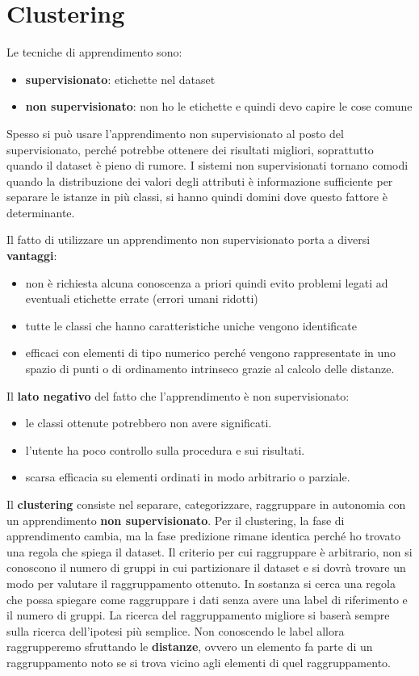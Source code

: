 \chapter{Clustering}
Le tecniche di apprendimento sono:
\begin{itemize}
    \item \textbf{supervisionato}: etichette nel dataset
    \item \textbf{non supervisionato}: non ho le etichette e quindi devo capire
          le cose comune
\end{itemize}
Spesso si può usare l'apprendimento non supervisionato al posto del supervisionato,
perché potrebbe ottenere dei risultati migliori, soprattutto quando il dataset è
pieno di rumore. I sistemi non supervisionati tornano comodi quando la distribuzione
dei valori degli attributi è informazione sufficiente per separare le istanze in più
classi, si hanno quindi domini dove questo fattore è determinante.

Il fatto di utilizzare un apprendimento non supervisionato porta a diversi
\textbf{vantaggi}:
\begin{itemize}
    \item non è richiesta alcuna conoscenza a priori quindi evito problemi legati
          ad eventuali etichette errate (errori umani ridotti)
    \item tutte le classi che hanno caratteristiche uniche vengono identificate
    \item efficaci con elementi di tipo numerico perché vengono rappresentate in
          uno spazio di punti o di ordinamento intrinseco grazie al calcolo delle
          distanze.
\end{itemize}
Il \textbf{lato negativo} del fatto che l'apprendimento è non supervisionato:
\begin{itemize}
    \item le classi ottenute potrebbero non avere significati.
    \item l'utente ha poco controllo sulla procedura e sui risultati.
    \item scarsa efficacia su elementi ordinati in modo arbitrario o parziale.
\end{itemize}
Il \textbf{clustering} consiste nel  separare, categorizzare, raggruppare in
autonomia con un apprendimento \textbf{non supervisionato}.
Per il clustering, la fase di apprendimento cambia, ma la fase predizione rimane
identica perché ho trovato una regola che spiega il dataset. Il criterio per cui
raggruppare è arbitrario, non si conoscono il numero di gruppi in cui partizionare
il dataset e si dovrà trovare un modo per valutare il raggruppamento ottenuto.
In sostanza si cerca una regola che possa spiegare come raggruppare i dati senza
avere una label di riferimento e il numero di gruppi. La ricerca del raggruppamento
migliore si baserà sempre sulla ricerca dell'ipotesi più semplice. Non conoscendo
le label allora raggrupperemo sfruttando le \textbf{distanze}, ovvero un elemento
fa parte di un raggruppamento noto se si trova vicino agli elementi di quel
raggruppamento.

